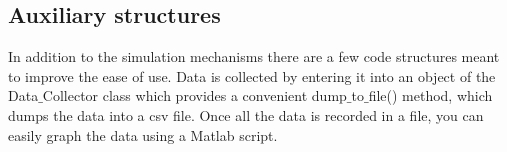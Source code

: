 \documentclass{IEEEtran}%
\begin{document}
\subsection{Auxiliary structures}
In addition to the simulation mechanisms there are a few code structures meant to improve the ease of use.  Data is collected by entering it into an object of the Data$\_$Collector class which provides a convenient dump$\_$to$\_$file() method, which dumps the data into a csv file.  Once all the data is recorded in a file, you can easily graph the data using a Matlab script.  
\end{document}
